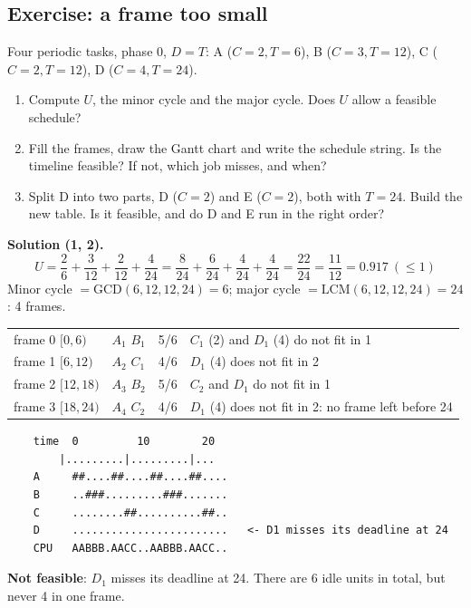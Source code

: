 \subsection{Exercise: a frame too small}
Four periodic tasks, phase 0, $D = T$: A ($C = 2, T = 6$), B ($C = 3, T = 12$), C ($C = 2, T = 12$), D ($C = 4, T = 24$).
\begin{enumerate}
    \item Compute $U$, the minor cycle and the major cycle. Does $U$ allow a feasible schedule?
    \item Fill the frames, draw the Gantt chart and write the schedule string. Is the timeline feasible? If not, which job misses, and when?
    \item Split D into two parts, D ($C = 2$) and E ($C = 2$), both with $T = 24$. Build the new table. Is it feasible, and do D and E run in the right order?
\end{enumerate}

\textbf{Solution (1, 2).}
\[
U = \frac{2}{6} + \frac{3}{12} + \frac{2}{12} + \frac{4}{24} = \frac{8}{24} + \frac{6}{24} + \frac{4}{24} + \frac{4}{24} = \frac{22}{24} = \frac{11}{12} = 0.917 \ (\le 1)
\]
Minor cycle $= \mathrm{GCD}(6, 12, 12, 24) = 6$; major cycle $= \mathrm{LCM}(6, 12, 12, 24) = 24$: 4 frames.
\begin{center}
    \begin{tabular}{l l l p{5.5cm}}
        \hline
        frame 0 $[0,6)$ & $A_1$ $B_1$ & 5/6 & $C_1$ (2) and $D_1$ (4) do not fit in 1 \\
        frame 1 $[6,12)$ & $A_2$ $C_1$ & 4/6 & $D_1$ (4) does not fit in 2 \\
        frame 2 $[12,18)$ & $A_3$ $B_2$ & 5/6 & $C_2$ and $D_1$ do not fit in 1 \\
        frame 3 $[18,24)$ & $A_4$ $C_2$ & 4/6 & $D_1$ (4) does not fit in 2: no frame left before 24 \\
        \hline
    \end{tabular}
\end{center}
\begin{verbatim}
    time  0         10        20
        |.........|.........|...
    A     ##....##....##....##....
    B     ..###.........###.......
    C     ........##..........##..
    D     ........................   <- D1 misses its deadline at 24
    CPU   AABBB.AACC..AABBB.AACC..
\end{verbatim}
\textbf{Not feasible}: $D_1$ misses its deadline at 24. There are 6 idle units in total, but never 4 in one frame.

